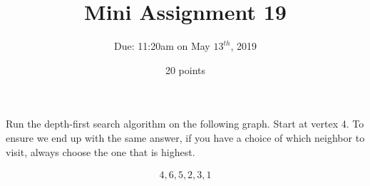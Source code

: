 \documentclass[12pt]{article}
\begin{document}
 
\title{Mini Assignment 19}
\author{Due: 11:20am on May $13^{th}$, 2019}
\date{20 points}
\maketitle

Run the depth-first search algorithm on the following graph. Start at vertex 4. To ensure we end up with the same answer, if you have a choice of which neighbor to visit, always choose the one that is highest.\\

\begin{align*}
	\boxed{4, 6, 5, 2, 3, 1}
\end{align*}
\end{document}
